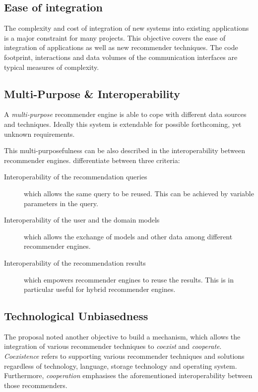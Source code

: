 \subsection{Ease of integration}
\label{intro-objectives-easeofintegration}

The complexity and cost of integration of new systems into existing applications is a major constraint for many projects. This objective covers the ease of integration of applications as well as new recommender techniques. The code footprint, interactions and data volumes of the communication interfaces are typical measures of complexity.

\subsection{Multi-Purpose \& Interoperability}
\label{intro-objectives-multipurpose}

A \emph{multi-purpose} recommender engine is able to cope with different data sources and techniques. Ideally this system is extendable for possible forthcoming, yet unknown requirements.

This multi-purposefulness can be also described in the interoperability between recommender engines. \citet{manouselis07} differentiate between three criteria:

\begin{description}
    \item[Interoperability of the recommendation queries] which allows the same query to be reused. This can be achieved by variable parameters in the query.
    \item[Interoperability of the user and the domain models] which allows the exchange of models and other data among different recommender engines.
    \item[Interoperability of the recommendation results] which empowers recommender engines to reuse the results. This is in particular useful for hybrid recommender engines.
\end{description}

\subsection{Technological Unbiasedness}

The proposal noted another objective to build a mechanism, which allows the integration of various recommender techniques to \emph{coexist} and \emph{cooperate}. \emph{Coexistence} refers to supporting various recommender techniques and solutions regardless of technology, language, storage technology and operating system. Furthermore, \emph{cooperation} emphasises the aforementioned interoperability between those recommenders.

